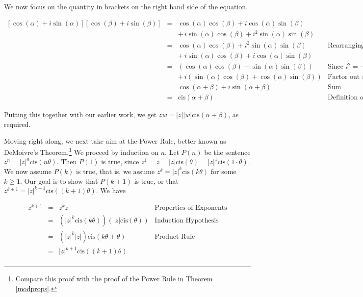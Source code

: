 We now focus on the quantity in brackets on the right hand side of the equation.

\[ \begin{array}{rcll}

\left[\cos(\alpha) + i\sin(\alpha)\right]\left[\cos(\beta) + i \sin(\beta)\right] & = & \cos(\alpha)\cos(\beta) + i\cos(\alpha)\sin(\beta) & \\
																																									&  & + \, i\sin(\alpha)\cos(\beta) + i^2 \sin(\alpha) \sin(\beta) & \\[3pt]
																																									& = & \cos(\alpha)\cos(\beta) +  i^2 \sin(\alpha) \sin(\beta)& \text{Rearranging terms} \\
																																									&  & + \, i\sin(\alpha)\cos(\beta) +i\cos(\alpha)\sin(\beta)  & \\[3pt]
																																									& = & \left(\cos(\alpha)\cos(\beta) - \sin(\alpha) \sin(\beta)\right) & \text{Since $i^2 = -1$}\\
																																									&  & + \, i\left(\sin(\alpha)\cos(\beta)+ \cos(\alpha)\sin(\beta)\right) & \text{Factor out $i$}\\[3pt] 
																																									& = & \cos(\alpha + \beta) + i \sin(\alpha+\beta) & \text{Sum identities} \\[3pt]
																																									& = & \text{cis}(\alpha + \beta) & \text{Definition of `cis'}
\end{array} \]

Putting this together with our earlier work, we get $zw = |z| |w| \text{cis}(\alpha + \beta)$, as required.  

\smallskip

Moving right along, we next take aim at the Power Rule, better known  as DeMoivre's Theorem.\footnote{Compare this proof with the proof of the Power Rule in Theorem \ref{modprops}.} We proceed by induction on $n$. Let $P(n)$ be the sentence $z^{n} = |z|^{n} \text{cis}(n \theta)$.  Then $P(1)$ is true, since $z^{1} = z = |z| \text{cis}(\theta) = |z|^{1} \text{cis}(1\cdot \theta)$.  We now assume $P(k)$ is true, that is, we assume  $z^{k} = |z|^{k} \text{cis}(k \theta)$ for some $k \geq 1$. Our goal is to show that $P(k+1)$ is true, or that $z^{k+1} = |z|^{k+1} \text{cis}((k+1)\theta)$. We have

\[ \begin{array}{rcll}

z^{k+1} & = & z^{k} z & \text{Properties of Exponents} \\[3pt]
				& = & \left(|z|^{k} \text{cis}(k \theta)\right) \left(|z| \text{cis}(\theta)\right) & \text{Induction Hypothesis}\\[3pt]
				& = & \left(|z|^k |z|\right) \text{cis}(k \theta + \theta) & \text{Product Rule}\\[3pt]
				& = & |z|^{k+1} \text{cis}((k+1)\theta) \\

\end{array} \] 

